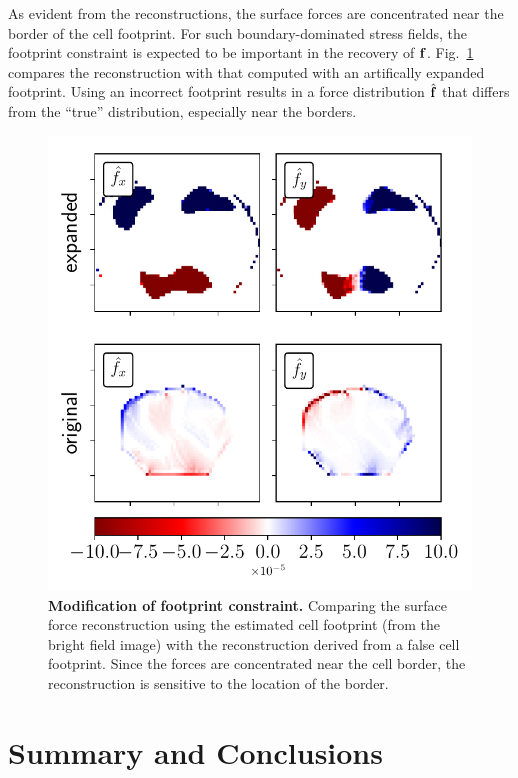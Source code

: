 \documentclass[aps,prl,reprint,twocolumn,groupedaddress,showpacs]{revtex4}
\def\f{{\bf f}}
\begin{document}
As evident from the reconstructions, the surface forces are
concentrated near the border of the cell footprint. For such
boundary-dominated stress fields, the footprint constraint is expected
to be important in the recovery of $\f$. Fig.~\ref{DATA3} compares the
reconstruction with that computed with an artifically expanded
footprint. Using an incorrect footprint results in a force
distribution $\hat{\f}$ that differs from the ``true'' distribution,
especially near the borders.
\begin{figure}
\includegraphics[width=\linewidth]{fig10}
\caption{\textbf{Modification of footprint constraint.} Comparing the
  surface force reconstruction using the estimated cell footprint
  (from the bright field image) with the reconstruction derived from a
  false cell footprint. Since the forces are concentrated near the
  cell border, the reconstruction is sensitive to the location of the
  border.}
\label{DATA3}
\end{figure}

\section{Summary and Conclusions}
\end{document}
